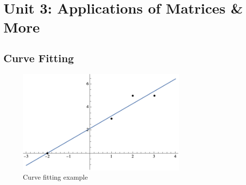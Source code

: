\documentclass[12pt]{article}
\begin{document}
\section[Unit 3]{Unit 3: Applications of Matrices \& More}

\subsection{Curve Fitting}

\begin{figure}[!ht]
    \centering
    \includegraphics[width=8.5cm]{misc/linearregressionexample.png}
    \caption{Curve fitting example}
    \label{fig:curvefitting}
\end{figure}
\end{document}
